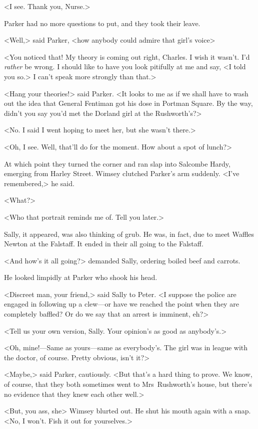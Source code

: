 <I see. Thank you, Nurse.>

Parker had no more questions to put, and they took their leave.

<Well,> said Parker, <how anybody could admire that girl's voice\longdash>

<You noticed that! My theory is coming out right, Charles. I wish it wasn't. I'd \emph{rather} be wrong. I should like to have you look pitifully at me and say, <I told you so.> I can't speak more strongly than that.>

<Hang your theories!> said Parker. <It looks to me as if we shall have to wash out the idea that General Fentiman got his dose in Portman Square. By the way, didn't you say you'd met the Dorland girl at the Rushworth's?>

<No. I said I went hoping to meet her, but she wasn't there.>

<Oh, I see. Well, that'll do for the moment. How about a spot of lunch?>

At which point they turned the corner and ran slap into Salcombe Hardy, emerging from Harley Street. Wimsey clutched Parker's arm suddenly. <I've remembered,> he said.

<What?>

<Who that portrait reminds me of. Tell you later.>

Sally, it appeared, was also thinking of grub. He was, in fact, due to meet Waffles Newton at the Falstaff. It ended in their all going to the Falstaff.

<And how's it all going?> demanded Sally, ordering boiled beef and carrots.

He looked limpidly at Parker who shook his head.

<Discreet man, your friend,> said Sally to Peter. <I suppose the police are engaged in following up a clew—or have we reached the point when they are completely baffled? Or do we say that an arrest is imminent, eh?>

<Tell us your own version, Sally. Your opinion's as good as anybody's.>

<Oh, mine!—Same as yours—same as everybody's. The girl was in league with the doctor, of course. Pretty obvious, isn't it?>

<Maybe,> said Parker, cautiously. <But that's a hard thing to prove. We know, of course, that they both sometimes went to Mrs~Rushworth's house, but there's no evidence that they knew each other well.>

<But, you ass, she\longdash> Wimsey blurted out. He shut his mouth again with a snap. <No, I won't. Fish it out for yourselves.>

